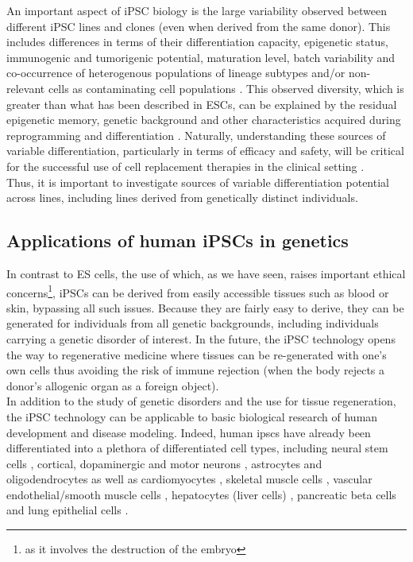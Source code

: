 An important aspect of iPSC biology is the  large variability observed between different iPSC lines and clones (even when derived from the same donor). 
This includes differences in terms of their differentiation capacity, epigenetic status, immunogenic and tumorigenic potential, maturation level, batch variability and co-occurrence of heterogenous populations of lineage subtypes and/or non-relevant cells as contaminating cell populations \cite{buganim2013mechanisms}.
This observed diversity, which is greater than what has been described in ESCs, can be explained by the residual epigenetic memory, genetic background and other characteristics acquired during reprogramming and differentiation \cite{kim2010epigenetic, polo2010cell, rouhani2014genetic}.
Naturally, understanding these sources of variable differentiation, particularly in terms of efficacy and safety, will be critical for the successful use of cell replacement therapies in the clinical setting \cite{buganim2013mechanisms}. \\

Thus, it is important to investigate sources of variable differentiation potential across lines, including lines derived from genetically distinct individuals.

\subsection{Applications of human iPSCs in genetics}
\label{sec:ips_genetics}

In contrast to ES cells, the use of which, as we have seen, raises important ethical concerns\footnote{as it involves the destruction of the embryo}, iPSCs can be derived from easily accessible tissues such as blood or skin, bypassing all such issues.
Because they are fairly easy to derive, they can be generated for individuals from all genetic backgrounds, including individuals carrying a genetic disorder of interest.
In the future, the iPSC technology opens the way to regenerative medicine where tissues can be re-generated with one's own cells thus avoiding the risk of immune rejection (when the body rejects a donor's allogenic organ as a foreign object).\\

In addition to the study of genetic disorders and the use for tissue regeneration, the iPSC technology can be applicable to basic biological research of human development and disease modeling.
Indeed, human \glspl{ipsc} have already been differentiated into a plethora of differentiated cell types, including neural stem cells \cite{d2014large}, 
cortical, dopaminergic and motor neurons \cite{shi2012human, kriks2011dopamine, karumbayaram2009directed}, astrocytes \cite{shaltouki2013efficient} and oligodendrocytes \cite{douvaras2014efficient} as well as  cardiomyocytes \cite{burridge2014chemically}, skeletal muscle cells \cite{maffioletti2015efficient},  vascular endothelial/smooth muscle cells \cite{patsch2015generation}, hepatocytes (liver cells) \cite{si2010highly}, pancreatic beta cells \cite{zhang2009highly} and  lung epithelial cells \cite{huang2014efficient}.\\


